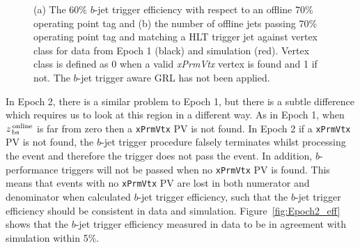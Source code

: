 \begin{figure}[!t]
\begin{center}
  \end{center}
    \vspace{-1em}
  \caption[The $b$-jet trigger efficiency with respect to an offline $b$-tagging
    and  the number of offline jets against vertex class for data from Epoch 1 and simulation.
    The $b$-jet trigger aware GRL has not been applied.]
          {(a) The 60\% $b$-jet trigger efficiency with respect to an offline 70\% operating point tag
    and  (b) the number of offline jets passing 70\% operating point tag and matching a HLT trigger jet
    against vertex class for data from Epoch 1 (black) and simulation (red).
    Vertex class is defined as 0 when a valid \textit{xPrmVtx} vertex is found and 1 if not.
    The $b$-jet trigger aware GRL has not been applied.}
    \label{fig:Epoch1_vtxClass}
\end{figure}



In Epoch 2, there is a similar problem to Epoch 1, but there is a subtle difference which requires us to look at this region in a different way.
As in Epoch 1, when  $z_{\,\text{bs}}^{\text{\,online}}$ is far from zero then a \verb|xPrmVtx| PV is not found.
In Epoch 2 if a \verb|xPrmVtx| PV is not found, the $b$-jet trigger procedure falsely terminates whilst processing the event and therefore the trigger does not pass the event.
In addition, $b$-performance triggers will not be passed when no \verb|xPrmVtx| PV is found.
This means that events with no \verb|xPrmVtx| PV are lost in both numerator and denominator when calculated $b$-jet trigger efficiency,
such that the $b$-jet trigger efficiency  should be consistent in data and simulation. 
Figure~\ref{fig:Epoch2_eff} shows that the $b$-jet trigger efficiency measured in data to be in agreement with simulation within 5\%.

